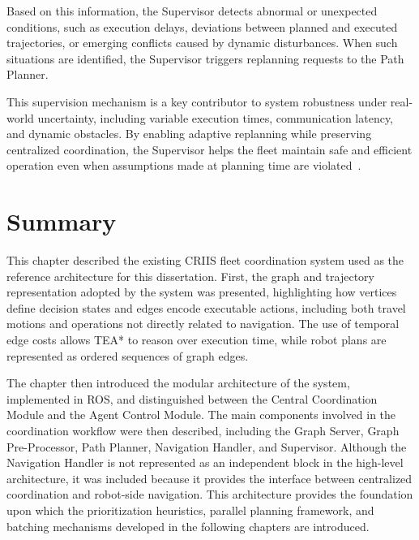 Based on this information, the Supervisor detects abnormal or unexpected conditions, such as
execution delays, deviations between planned and executed trajectories, or emerging conflicts caused
by dynamic disturbances. When such situations are identified, the Supervisor triggers replanning
requests to the Path Planner.

This supervision mechanism is a key contributor to system robustness under real-world uncertainty,
including variable execution times, communication latency, and dynamic obstacles. By enabling
adaptive replanning while preserving centralized coordination, the Supervisor helps the fleet
maintain safe and efficient operation even when assumptions made at planning time are
violated~\cite{matos2025criis}.

\section{Summary}
\label{sec:criis_system_summary}
\hspace{\parindent}
This chapter described the existing CRIIS fleet coordination system used as the reference
architecture for this dissertation. First, the graph and trajectory representation adopted by the
system was presented, highlighting how vertices define decision states and edges encode executable
actions, including both travel motions and operations not directly related to navigation. The use of
temporal edge costs allows TEA* to reason over execution time, while robot plans are represented as
ordered sequences of graph edges.

The chapter then introduced the modular architecture of the system, implemented in ROS, and
distinguished between the Central Coordination Module and the Agent Control Module. The main
components involved in the coordination workflow were then described, including the Graph Server,
Graph Pre-Processor, Path Planner, Navigation Handler, and Supervisor. Although the Navigation
Handler is not represented as an independent block in the high-level architecture, it was included
because it provides the interface between centralized coordination and robot-side navigation. This
architecture provides the foundation upon which the prioritization heuristics, parallel planning
framework, and batching mechanisms developed in the following chapters are introduced.
